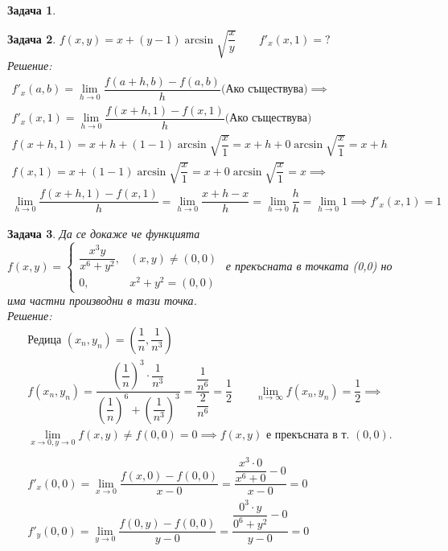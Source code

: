 \documentclass[a4paper,fleqn,12pt]{article}
\newtheorem{task}{Задача}[section]
\begin{document}
\begin{task}
\begin{enumerate}
\end{enumerate}

\end{task}

\begin{task}
$f(x,y) = x + (y-1)\arcsin{\sqrt{\dfrac{x}{y}}}\qquad f'_x(x,1) = ?$\\ 
Решение:
\begin{gather*}
f'_x (a,b) = \lim\limits_{h \to 0} \dfrac{f(a +h,b) - f(a,b)}{h} \text{(Ако съществува)} \implies \\
f'_x(x,1) =  \lim\limits_{h \to 0} \dfrac{f(x +h,1) - f(x,1)}{h} \text{(Ако съществува)}\\
f(x +h,1) = x + h + (1-1)\arcsin{\sqrt{\dfrac{x}{1}}} = x + h + 0 \arcsin{\sqrt{\dfrac{x}{1}}} =  x + h \\
f(x,1) = x + (1-1)\arcsin{\sqrt{\dfrac{x}{1}}} = x + 0 \arcsin{\sqrt{\dfrac{x}{1}}} =  x \implies \\
\lim\limits_{h \to 0} \dfrac{f(x +h,1) - f(x,1)}{h} =  \lim\limits_{h \to 0} \dfrac{x + h - x}{h} = \lim\limits_{h \to 0} \dfrac{h}{h} =  \lim\limits_{h \to 0} 1 \implies f'_x(x,1) = 1
\end{gather*}
\end{task}

\begin{task}
Да се докаже че функцията $f(x,y) = 
\begin{cases}
\dfrac{x^3y}{x^6 + y^2}, & (x,y) \neq (0,0)  \\
0, & x^2 + y^2 = (0,0) 
\end{cases}
$ е прекъсната в точката (0,0) но има частни производни в тази точка. \\
Решение:
\begin{gather*}
\text{Редица } (x_n, y_n) = \left(\dfrac{1}{n}, \dfrac{1}{n^3} \right) \\
f(x_n, y_n) = \dfrac{ \left( \dfrac{1}{n} \right)^3 \cdot \dfrac{1}{n^3}}{\left( \dfrac{1}{n}\right)^6 + \left( \dfrac{1}{n^3} \right)^3 } = \dfrac{\dfrac{1}{n^6}}{\dfrac{2}{n^6}} = \dfrac{1}{2} \qquad \lim\limits_{n \to \infty} f(x_n, y_n) = \dfrac{1}{2}  \implies \\
\lim\limits_{x \to 0, y \to 0 } f(x, y) \neq f(0,0) = 0 \implies f(x, y) \text{ е прекъсната в т. }(0,0).\\
\\
f'_x (0,0) = \lim\limits_{x \to 0} \dfrac{f(x,0) - f(0,0)}{x - 0} = \dfrac{ \dfrac{x^3 \cdot 0}{x^6 + 0} - 0}{x - 0} = 0 \\
f'_y (0,0) = \lim\limits_{y \to 0} \dfrac{f(0,y) - f(0,0)}{y - 0} = \dfrac{\dfrac{0^3 \cdot y}{0^6 + y^2} - 0}{y - 0} = 0
\end{gather*}
\end{task}
\end{document}

